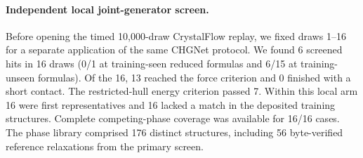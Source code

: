 \paragraph{Independent local joint-generator screen.}
Before opening the timed 10,000-draw CrystalFlow replay, we fixed draws 1--16 for a separate application of the same CHGNet protocol. We found 6 screened hits in 16 draws (0/1 at training-seen reduced formulas and 6/15 at training-unseen formulas). Of the 16, 13 reached the force criterion and 0 finished with a short contact. The restricted-hull energy criterion passed 7. Within this local arm 16 were first representatives and 16 lacked a match in the deposited training structures. Complete competing-phase coverage was available for 16/16 cases. The phase library comprised 176 distinct structures, including 56 byte-verified reference relaxations from the primary screen.
